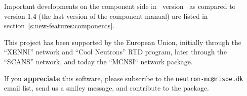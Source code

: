 Important developments on the component side in \MCS\ version \version\ 
as compared to version 1.4 (the last version of the component manual) are listed in section~\ref{s:new-features:components}.

This project has been supported by the European Union, initially
through the ``XENNI'' network and ``Cool Neutrons'' RTD program, later
through the ``SCANS'' network, and today the ``MCNSI`` network package.

If you {\bf appreciate} this software, please subscribe to the \verb+neutron-mc@risoe.dk+ email list, send us a smiley message, and contribute to the package.



